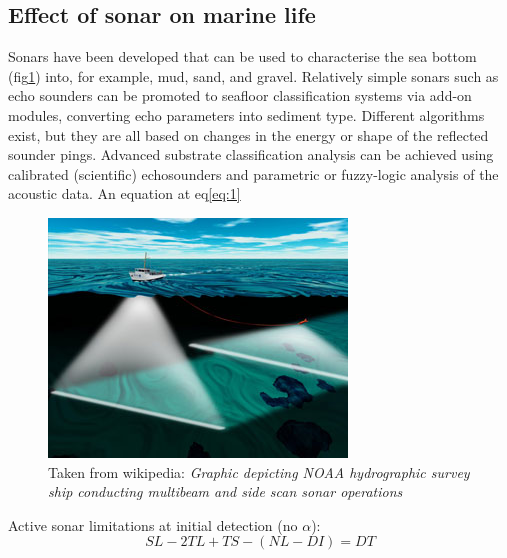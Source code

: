 \documentclass[twocolumn]{article}
\begin{document}
\subsection{Effect of sonar on marine life}
Sonars have been developed that can be used to characterise the sea bottom (fig\ref{fig:sample2}) into, for example, mud, sand, and gravel. Relatively simple sonars such as echo sounders can be promoted to seafloor classification systems via add-on modules, converting echo parameters into sediment type. Different algorithms exist, but they are all based on changes in the energy or shape of the reflected sounder pings. Advanced substrate classification analysis can be achieved using calibrated (scientific) echosounders and parametric or fuzzy-logic analysis of the acoustic data. An equation at eq\ref{eq:1}
\begin{figure}
\includegraphics[scale=0.4]{pics/seabedWikiPic}
\caption{\label{fig:sample2}Taken from wikipedia: \emph{Graphic depicting NOAA hydrographic survey ship conducting multibeam and side scan sonar operations}}
\end{figure}

Active sonar limitations at initial detection (no $\alpha$):
\begin{equation}
  \label{eq:1}
SL - 2TL + TS - (NL-DI) = DT
\end{equation}
\end{document}
